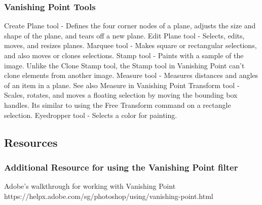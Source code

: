 \documentclass{beamer}
\begin{document}
				\begin{frame}
	\frametitle{Vanishing Point Tools}
	\begin{outline}
		\1 Create Plane tool - Defines the four corner nodes of a plane, adjusts the size and shape of the plane, and tears off a new plane.
		\1 Edit Plane tool - Selects, edits, moves, and resizes planes.
		\1 Marquee tool - Makes square or rectangular selections, and also moves or clones selections.
		\1 Stamp tool - Paints with a sample of the image. Unlike the Clone Stamp tool, the Stamp tool in Vanishing Point can’t clone elements from another image. 
		\1 Measure tool - Measures distances and angles of an item in a plane. See also Measure in Vanishing Point
		\1 Transform tool - Scales, rotates, and moves a floating selection by moving the bounding box handles. Its similar to using the Free Transform command on a rectangle selection. 
		\1 Eyedropper tool - Selects a color for painting.
	\end{outline}
\end{frame}

				\subsection{Resources}		
\begin{frame}
	\frametitle{Additional Resource for using the Vanishing Point filter}
	\begin{outline}
		\1 Adobe's walkthrough for working with Vanishing Point
		\2 https://helpx.adobe.com/sg/photoshop/using/vanishing-point.html
	\end{outline}
\end{frame}



		\section{}
\end{document}
